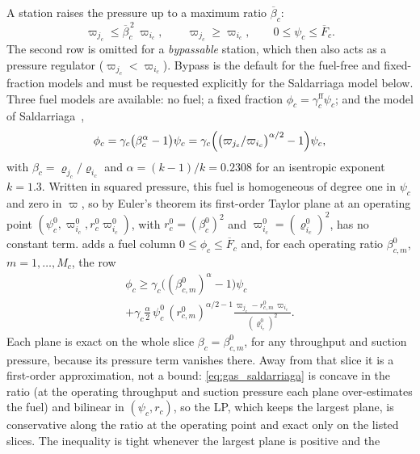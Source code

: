 A station raises the pressure up to a maximum ratio
$\overline{\beta}_c$:
\begin{equation}
\label{eq:gas_ratio}
\varpi_{j_c} \leq \overline{\beta}_c^{\,2}\, \varpi_{i_c},
\qquad
\varpi_{j_c} \geq \varpi_{i_c},
\qquad
0 \leq \psi_c \leq \overline{F}_c .
\end{equation}
The second row is omitted for a \emph{bypassable} station, which then
also acts as a pressure regulator ($\varpi_{j_c} < \varpi_{i_c}$).
Bypass is the default for the fuel-free and fixed-fraction models and
must be requested explicitly for the Saldarriaga model below.  Three
fuel models are available: no fuel; a fixed fraction
$\phi_c = \gamma^{\mathrm{ff}}_c \psi_c$; and the model of
Saldarriaga~\cite[eqs.~(2.70)--(2.72)]{saldarriaga2018phd},
\begin{equation}
\label{eq:gas_saldarriaga}
\phi_c = \gamma_c\bigl(\beta_c^{\alpha} - 1\bigr)\psi_c
       = \gamma_c\Bigl(\bigl(\varpi_{j_c}/\varpi_{i_c}\bigr)^{\alpha/2}
         - 1\Bigr)\psi_c ,
\end{equation}
with $\beta_c = \varrho_{j_c}/\varrho_{i_c}$ and
$\alpha = (k-1)/k = 0.2308$ for an isentropic exponent $k = 1.3$.
Written in squared pressure, this fuel is homogeneous of degree one in
$\psi_c$ and zero in $\varpi$, so by Euler's theorem its first-order
Taylor plane at an operating point
$(\psi^0_c, \varpi^0_{i_c}, r^0_c\varpi^0_{i_c})$, with
$r^0_c = (\beta^0_c)^2$ and $\varpi^0_{i_c} = (\varrho^0_{i_c})^2$, has
no constant term.  \gtopt{} adds a fuel column
$0 \leq \phi_c \leq \overline{F}_c$ and, for each operating ratio
$\beta^0_{c,m}$, $m = 1,\dots,M_c$, the row
\begin{multline}
\label{eq:gas_fuel_plane}
\phi_c \geq \gamma_c\bigl((\beta^0_{c,m})^{\alpha} - 1\bigr)\psi_c \\
+ \gamma_c \frac{\alpha}{2}\,\psi^0_c\,(r^0_{c,m})^{\alpha/2 - 1}
  \frac{\varpi_{j_c} - r^0_{c,m}\,\varpi_{i_c}}{(\varrho^0_{i_c})^2} .
\end{multline}
Each plane is exact on the whole slice $\beta_c = \beta^0_{c,m}$, for
any throughput and suction pressure, because its pressure term vanishes
there.  Away from that slice it is a first-order approximation, not a
bound: \eqref{eq:gas_saldarriaga} is concave in the ratio (at the
operating throughput and suction pressure each plane over-estimates
the fuel) and bilinear
in $(\psi_c, r_c)$, so the LP, which keeps the largest plane, is
conservative along the ratio at the operating point and exact only on
the listed slices.  The
inequality is tight whenever the largest plane is positive and the
